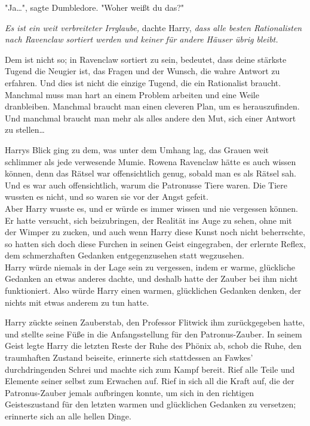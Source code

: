 {"Ja…", sagte Dumbledore. "Woher weißt du das?"

\emph{Es ist ein weit verbreiteter Irrglaube,} dachte Harry, \emph{dass alle besten Rationalisten nach Ravenclaw sortiert werden und keiner für andere Häuser übrig bleibt.}

Dem ist nicht so; in Ravenclaw sortiert zu sein, bedeutet, dass deine stärkste Tugend die Neugier ist, das Fragen und der Wunsch, die wahre Antwort zu erfahren. Und dies ist nicht die einzige Tugend, die ein Rationalist braucht. Manchmal muss man hart an einem Problem arbeiten und eine Weile dranbleiben. Manchmal braucht man einen cleveren Plan, um es herauszufinden. Und manchmal braucht man mehr als alles andere den Mut, sich einer Antwort zu stellen…

Harrys Blick ging zu dem, was unter dem Umhang lag, das Grauen weit schlimmer als jede verwesende Mumie. Rowena Ravenclaw hätte es auch wissen können, denn das Rätsel war offensichtlich genug, sobald man es als Rätsel sah. Und es war auch offensichtlich, warum die Patronusse Tiere waren. Die Tiere wussten es nicht, und so waren sie vor der Angst gefeit.\\ Aber Harry wusste es, und er würde es immer wissen und nie vergessen können. Er hatte versucht, sich beizubringen, der Realität ins Auge zu sehen, ohne mit der Wimper zu zucken, und auch wenn Harry diese Kunst noch nicht beherrschte, so hatten sich doch diese Furchen in seinen Geist eingegraben, der erlernte Reflex, dem schmerzhaften Gedanken entgegenzusehen statt wegzusehen.\\ Harry würde niemals in der Lage sein zu vergessen, indem er warme, glückliche Gedanken an etwas anderes dachte, und deshalb hatte der Zauber bei ihm nicht funktioniert. Also würde Harry einen warmen, glücklichen Gedanken denken, der nichts mit etwas anderem zu tun hatte.

Harry zückte seinen Zauberstab, den Professor Flitwick ihm zurückgegeben hatte, und stellte seine Füße in die Anfangsstellung für den Patronus-Zauber. In seinem Geist legte Harry die letzten Reste der Ruhe des Phönix ab, schob die Ruhe, den traumhaften Zustand beiseite, erinnerte sich stattdessen an Fawkes' durchdringenden Schrei und machte sich zum Kampf bereit. Rief alle Teile und Elemente seiner selbst zum Erwachen auf. Rief in sich all die Kraft auf, die der Patronus-Zauber jemals aufbringen konnte, um sich in den richtigen Geisteszustand für den letzten warmen und glücklichen Gedanken zu versetzen; erinnerte sich an alle hellen Dinge.

}
